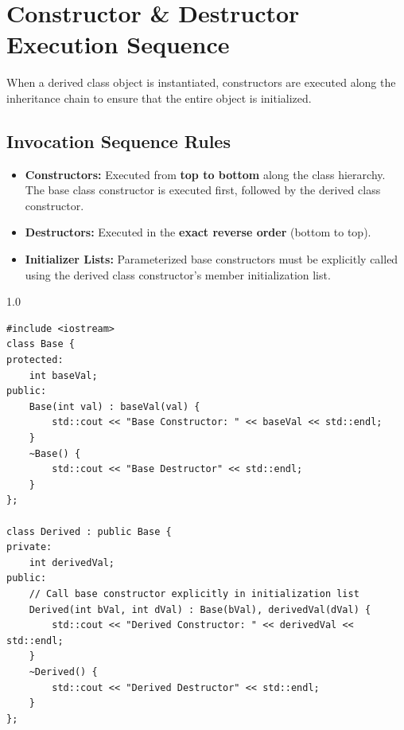 \documentclass[12pt,a4paper]{article}
\begin{document}
\section{Constructor \& Destructor Execution Sequence}

When a derived class object is instantiated, constructors are executed along the inheritance chain to ensure that the entire object is initialized.

\subsection{Invocation Sequence Rules}
\begin{itemize}[leftmargin=*, itemsep=3pt]
  \item \textbf{Constructors:} Executed from \textbf{top to bottom} along the class hierarchy. The base class constructor is executed first, followed by the derived class constructor.
  \item \textbf{Destructors:} Executed in the \textbf{exact reverse order} (bottom to top).
  \item \textbf{Initializer Lists:} Parameterized base constructors must be explicitly called using the derived class constructor's member initialization list.
\end{itemize}

\begin{tcolorbox}[examplebox, title={Code Example: Invocation of parameterized base constructors}]
\begin{spacing}{1.0}
\begin{verbatim}
#include <iostream>
class Base {
protected:
    int baseVal;
public:
    Base(int val) : baseVal(val) {
        std::cout << "Base Constructor: " << baseVal << std::endl;
    }
    ~Base() {
        std::cout << "Base Destructor" << std::endl;
    }
};

class Derived : public Base {
private:
    int derivedVal;
public:
    // Call base constructor explicitly in initialization list
    Derived(int bVal, int dVal) : Base(bVal), derivedVal(dVal) {
        std::cout << "Derived Constructor: " << derivedVal << std::endl;
    }
    ~Derived() {
        std::cout << "Derived Destructor" << std::endl;
    }
};
\end{verbatim}
\end{spacing}
\end{tcolorbox}
\end{document}
